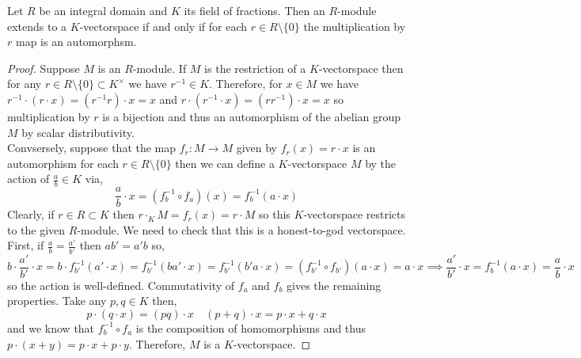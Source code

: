 \documentclass[12pt]{extarticle}
\begin{document}
\begin{lemma} \label{module-vectorspace}
Let $R$ be an integral domain and $K$ its field of fractions. Then an $R$-module extends to a $K$-vectorspace if and only if for each $r \in R \setminus \{0\}$ the multiplication by $r$ map is an automorphsm. 
\end{lemma}

\begin{proof}
Suppose $M$ is an $R$-module. If $M$ is the restriction of a $K$-vectorspace then for any $r \in R \setminus \{0\} \subset K^\times$ we have $r^{-1} \in K$. Therefore, for $x \in M$ we have $r^{-1} \cdot (r \cdot x) = (r^{-1} r) \cdot x = x$ and $r \cdot (r^{-1} \cdot x) = (r r^{-1}) \cdot x = x$ so multiplication by $r$ is a bijection and thus an automorphism of the abelian group $M$ by scalar distributivity.
\bigskip\\
Convsersely, suppose that the map $f_r : M \to M$ given by $f_r(x) = r \cdot x$ is an automorphism for each $r \in R \setminus \{0\}$ then we can define a $K$-vectorspace $M$ by the action of $\frac{a}{b} \in K$ via, 
\[\frac{a}{b} \cdot x = (f_b^{-1} \circ f_a)(x) = f_b^{-1}(a \cdot x)\]
Clearly, if $r \in R \subset K$ then $r \cdot_K M = f_r(x) = r \cdot M$ so this $K$-vectorspace restricts to the given $R$-module. We need to check that this is a honest-to-god vectorspace. First, if $\frac{a}{b} = \frac{a'}{b'}$ then $ab' = a'b$ so,
\[ b \cdot \frac{a'}{b'} \cdot x = b \cdot f_{b'}^{-1}( a' \cdot x) = f_{b'}^{-1}(b a' \cdot x) = f_{b'}^{-1}(b' a \cdot x) = (f_{b'}^{-1} \circ f_{b'})( a \cdot x) = a \cdot x \implies \frac{a'}{b'} \cdot x = f_{b}^{-1}(a \cdot x) = \frac{a}{b} \cdot x\]
so the action is well-defined. Commutativity of $f_{a}$ and $f_{b}$ gives the remaining properties. Take any $p,q \in K$ then,
\[ p \cdot (q \cdot x) = (pq) \cdot x \quad (p + q) \cdot x = p \cdot x + q \cdot x \]
and we know that $f_{b}^{-1} \circ f_{a}$ is the composition of homomorphisms and thus $p \cdot (x + y) = p \cdot x + p \cdot y$. Therefore, $M$ is a $K$-vectorspace.     
\end{proof}
\end{document}
